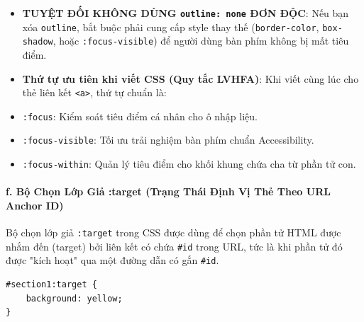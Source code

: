 \documentclass[11pt,oneside]{book}
\newcommand{\codeinline}[1]{\textcolor{accentOrange}{\texttt{#1}}}
\begin{document}
\begin{warnBox}
\begin{itemize}[leftmargin=1.5em, itemsep=3pt, parsep=0pt]
    \item \textbf{TUYỆT ĐỐI KHÔNG DÙNG \codeinline{outline: none} ĐƠN ĐỘC}: Nếu bạn xóa \codeinline{outline}, bắt buộc phải cung cấp style thay thế (\codeinline{border-color}, \codeinline{box-shadow}, hoặc \codeinline{:focus-visible}) để người dùng bàn phím không bị mất tiêu điểm.
    \item \textbf{Thứ tự ưu tiên khi viết CSS (Quy tắc LVHFA)}: Khi viết cùng lúc cho thẻ liên kết \codeinline{<a>}, thứ tự chuẩn là:
    \par\vspace{3pt}
\end{itemize}
\end{warnBox}

\begin{conceptBox}
\begin{itemize}[leftmargin=1.5em, itemsep=2pt, parsep=0pt]
    \item \codeinline{:focus}: Kiểm soát tiêu điểm cá nhân cho ô nhập liệu.
    \item \codeinline{:focus-visible}: Tối ưu trải nghiệm bàn phím chuẩn Accessibility.
    \item \codeinline{:focus-within}: Quản lý tiêu điểm cho khối khung chứa cha từ phần tử con.
\end{itemize}
\end{conceptBox}

\paragraph{f. Bộ Chọn Lớp Giả :target (Trạng Thái Định Vị Thẻ Theo URL Anchor ID)}

Bộ chọn lớp giả \codeinline{:target} trong CSS được dùng để chọn phần tử HTML được nhắm đến (target) bởi liên kết có chứa \codeinline{\#id} trong URL, tức là khi phần tử đó được "kích hoạt" qua một đường dẫn có gắn \codeinline{\#id}.

\begin{codeWindow}
\begin{lstlisting}[language=CSS3]
#section1:target {
    background: yellow;
}
\end{lstlisting}
\end{codeWindow}
\end{document}
